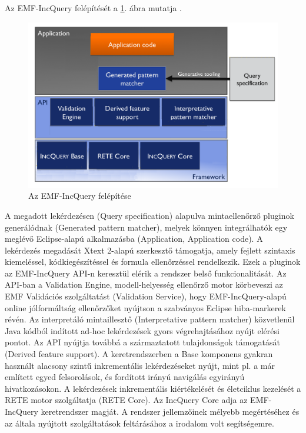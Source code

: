 Az EMF-IncQuery felépítését a \ref{fig:EMFIncQueryStructure}. ábra mutatja \cite{Bergmann-TOOLS-2012}.
%
\begin{figure}[htb]
\centering
\includegraphics[width=\textwidth]{figures/emf-incquery-structure.png}
\caption{Az EMF-IncQuery felépítése}
\label{fig:EMFIncQueryStructure}
\end{figure}
%
A megadott lekérdezésen (Query specification) alapulva mintaellenőrző pluginok generálódnak (Generated pattern matcher), melyek könnyen integrálhatók egy meglévő Eclipse-alapú alkalmazásba (Application, Application code).
A lekérdezés megadását Xtext 2-alapú szerkesztő támogatja, amely fejlett szintaxis kiemeléssel, kódkiegészítéssel és formula ellenőrzéssel rendelkezik.
Ezek a pluginok az EMF-IncQuery API-n keresztül elérik a rendszer belső funkcionalitását.
Az API-ban a Validation Engine, modell-helyesség ellenőrző motor körbeveszi az \gls{EMF} Validációs szolgáltatást (Validation Service), hogy EMF-IncQuery-alapú online jólformáltság ellenőrzőket nyújtson a szabványos Eclipse hiba-markerek révén.
Az interpretáló mintaillesztő (Interpretative pattern matcher) közvetlenül Java kódból indított ad-hoc lekérdezések gyors végrehajtásához nyújt elérési pontot.
Az API nyújtja továbbá a származtatott tulajdonságok támogatását (Derived feature support).
A keretrendszerben a Base komponens gyakran használt alacsony szintű inkrementális lekérdezéseket nyújt, mint pl. a már említett egyed felsorolások, és fordított irányú navigálás egyirányú hivatkozásokon.
A lekérdezések inkrementális kiértékelését és életciklus kezelését a RETE motor szolgáltatja (RETE Core).
Az IncQuery Core adja az EMF-IncQuery keretrendszer magját.
A rendszer jellemzőinek mélyebb megértéséhez és az általa nyújtott szolgáltatások feltárásához a \cite{Bergmann-TOOLS-2012} irodalom volt segítségemre.

